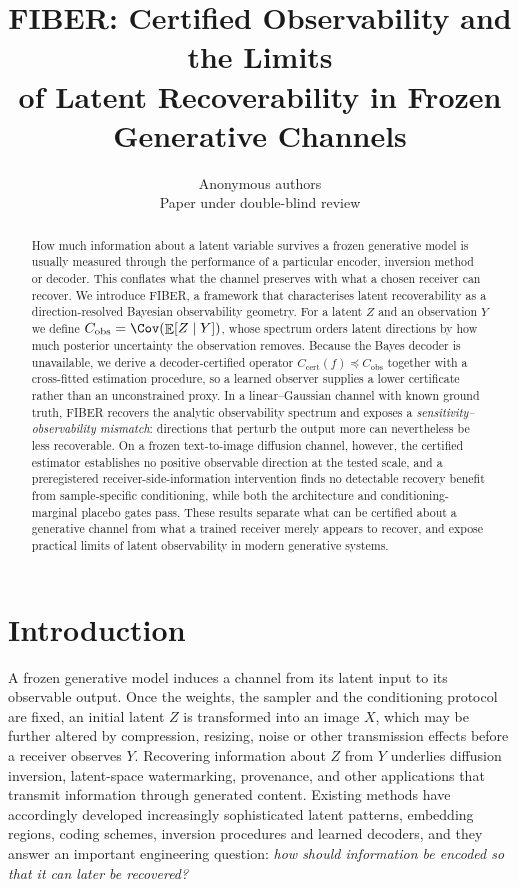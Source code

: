 \documentclass{article}
\title{FIBER: Certified Observability and the Limits\\
of Latent Recoverability in Frozen Generative Channels}
\author{Anonymous authors\\Paper under double-blind review}
\theoremstyle{definition}
\DeclareMathOperator{\Exp}{\mathbb{E}}
\newcommand{\Cobs}{C_{\mathrm{obs}}}
\newcommand{\Ccert}{C_{\mathrm{cert}}}
\begin{document}
\maketitle

\begin{abstract}
How much information about a latent variable survives a frozen generative model is
usually measured through the performance of a particular encoder, inversion method or
decoder. This conflates what the channel preserves with what a chosen receiver can
recover. We introduce FIBER, a framework that characterises latent recoverability as a
direction-resolved Bayesian observability geometry. For a latent $Z$ and an observation
$Y$ we define $\Cobs=\Cov(\Exp[Z\mid Y])$, whose spectrum orders latent directions by how
much posterior uncertainty the observation removes. Because the Bayes decoder is
unavailable, we derive a decoder-certified operator $\Ccert(f)\preceq\Cobs$ together with
a cross-fitted estimation procedure, so a learned observer supplies a lower certificate
rather than an unconstrained proxy. In a linear--Gaussian channel with known ground truth,
FIBER recovers the analytic observability spectrum and exposes a
\emph{sensitivity--observability mismatch}: directions that perturb the output more can
nevertheless be less recoverable. On a frozen text-to-image diffusion channel, however,
the certified estimator establishes no positive observable direction at the tested scale,
and a preregistered receiver-side-information intervention finds no detectable recovery
benefit from sample-specific conditioning, while both the architecture and
conditioning-marginal placebo gates pass. These results separate what can be certified
about a generative channel from what a trained receiver merely appears to recover, and
expose practical limits of latent observability in modern generative systems.
\end{abstract}

\section{Introduction}

A frozen generative model induces a channel from its latent input to its observable
output. Once the weights, the sampler and the conditioning protocol are fixed, an initial
latent $Z$ is transformed into an image $X$, which may be further altered by compression,
resizing, noise or other transmission effects before a receiver observes $Y$. Recovering
information about $Z$ from $Y$ underlies diffusion inversion, latent-space watermarking,
provenance, and other applications that transmit information through generated content.
Existing methods have accordingly developed increasingly sophisticated latent patterns,
embedding regions, coding schemes, inversion procedures and learned decoders, and they
answer an important engineering question: \emph{how should information be encoded so that
it can later be recovered?}
\end{document}
